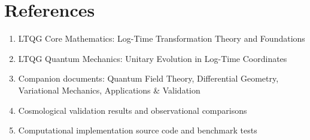 \documentclass[11pt,a4paper]{article}
\begin{document}
\section*{References}

\begin{enumerate}
\item LTQG Core Mathematics: Log-Time Transformation Theory and Foundations
\item LTQG Quantum Mechanics: Unitary Evolution in Log-Time Coordinates
\item Companion documents: Quantum Field Theory, Differential Geometry, Variational Mechanics, Applications \& Validation
\item Cosmological validation results and observational comparisons
\item Computational implementation source code and benchmark tests
\end{enumerate}
\end{document}
